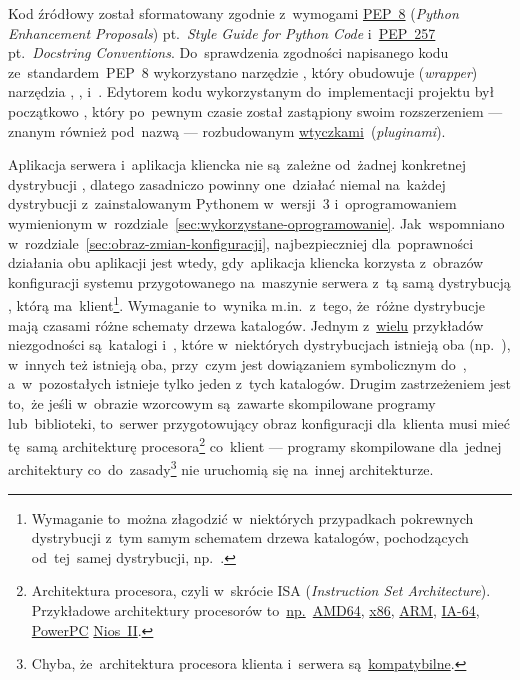 \documentclass[thesis]{subfiles}
\begin{document}
Kod źródłowy został sformatowany zgodnie z~wymogami \href{https://www.python.org/dev/peps/pep-0008/}{PEP~8} (\emph{Python Enhancement Proposals}) pt.~\emph{Style Guide for Python Code} i~\href{https://www.python.org/dev/peps/pep-0257/}{PEP~257} pt.~\emph{Docstring Conventions}. Do~sprawdzenia zgodności napisanego kodu ze~standardem~PEP~8 wykorzystano narzędzie , który obudowuje (\emph{wrapper}) narzędzia , ,  i~. Edytorem kodu wykorzystanym do~implementacji projektu był początkowo , który po~pewnym czasie został zastąpiony swoim rozszerzeniem  --- znanym również pod~nazwą  --- rozbudowanym \href{http://vimawesome.com/}{wtyczkami}~(\emph{pluginami}).

Aplikacja serwera i~aplikacja kliencka nie są~zależne od~żadnej konkretnej dystrybucji , dlatego zasadniczo powinny one~działać niemal na~każdej dystrybucji z~zainstalowanym Pythonem w~wersji~3 i~oprogramowaniem wymienionym w~rozdziale~\ref{sec:wykorzystane-oprogramowanie}. Jak~wspomniano w~rozdziale~\ref{sec:obraz-zmian-konfiguracji}, najbezpieczniej dla~poprawności działania obu aplikacji jest wtedy, gdy~aplikacja kliencka korzysta z~obrazów konfiguracji systemu przygotowanego na~maszynie serwera z~tą samą dystrybucją , którą ma~klient\footnote{Wymaganie to~można złagodzić w~niektórych przypadkach pokrewnych dystrybucji z~tym samym schematem drzewa katalogów, pochodzących od~tej~samej dystrybucji, np.~\debian{}.}. Wymaganie to~wynika m.in.~z~tego, że~różne dystrybucje mają czasami różne schematy drzewa katalogów. Jednym z~\href{https://en.wikipedia.org/wiki/Filesystem_Hierarchy_Standard#FHS_compliance}{wielu} przykładów niezgodności są~katalogi  i~, które w~niektórych dystrybucjach istnieją oba (np.~\debian{}), w~innych też istnieją oba, przy~czym  jest dowiązaniem symbolicznym do~, a~w~pozostałych istnieje tylko jeden z~tych katalogów. Drugim zastrzeżeniem jest to,~że jeśli w~obrazie wzorcowym są~zawarte skompilowane programy lub~biblioteki, to~serwer przygotowujący obraz konfiguracji dla~klienta musi mieć tę~samą architekturę procesora\footnote{Architektura procesora, czyli w~skrócie ISA (\emph{Instruction Set Architecture}). Przykładowe architektury procesorów to~\href{https://en.wikipedia.org/wiki/List_of_instruction_sets}{np.}~\href{https://en.wikipedia.org/wiki/X86-64}{AMD64}, \href{https://en.wikipedia.org/wiki/X86}{x86}, \href{https://en.wikipedia.org/wiki/ARM_architecture}{ARM}, \href{https://en.wikipedia.org/wiki/IA-64}{IA-64}, \href{https://en.wikipedia.org/wiki/PowerPC}{PowerPC} \href{https://en.wikipedia.org/wiki/Nios_II}{Nios~II}.} co~klient --- programy skompilowane dla~jednej architektury co~do~zasady\footnote{Chyba, że~architektura procesora klienta i~serwera są~\href{https://en.wikipedia.org/wiki/X86-64\#OPMODES}{kompatybilne}.} nie uruchomią się na~innej architekturze.
\end{document}
